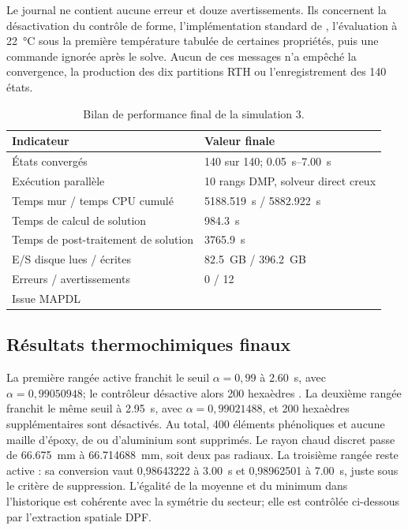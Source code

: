 \documentclass[oneside,openany]{amsdtx}
\begin{document}
Le journal ne contient aucune erreur et douze avertissements. Ils concernent
la désactivation du contrôle de forme, l'implémentation standard de
, l'évaluation à \SI{22}{\celsius} sous la première température
tabulée de certaines propriétés, puis une commande  ignorée
après le solve. Aucun de ces messages n'a empêché la convergence, la production
des dix partitions RTH ou l'enregistrement des 140 états.

\begin{table}[H]
\centering
\small
\renewcommand{\arraystretch}{1.15}
\begin{tabular}{L{0.49\textwidth}L{0.37\textwidth}}
\toprule
\textbf{Indicateur} & \textbf{Valeur finale} \\
\midrule
États convergés & 140 sur 140; \SIrange{0.05}{7.00}{s} \\
Exécution parallèle & 10 rangs DMP, solveur direct creux \\
Temps mur / temps CPU cumulé & \SI{5188.519}{s} / \SI{5882.922}{s} \\
Temps de calcul de solution & \SI{984.3}{s} \\
Temps de post-traitement de solution & \SI{3765.9}{s} \\
E/S disque lues / écrites & \SI{82.5}{GB} / \SI{396.2}{GB} \\
Erreurs / avertissements & 0 / 12 \\
Issue MAPDL &  \\
\bottomrule
\end{tabular}
\caption{Bilan de performance final de la simulation 3.}
\label{tab:sim3-performance}
\end{table}

\subsection{Résultats thermochimiques finaux}

La première rangée active franchit le seuil \(\alpha=0{,}99\) à
\SI{2.60}{s}, avec \(\alpha=0{,}99050948\); le contrôleur désactive alors 200
hexaèdres . La deuxième rangée franchit le même seuil à
\SI{2.95}{s}, avec \(\alpha=0{,}99021488\), et 200 hexaèdres supplémentaires
sont désactivés. Au total, 400 éléments phénoliques et aucune maille d'époxy,
de  ou d'aluminium sont supprimés. Le rayon chaud discret passe de
\SI{66.675}{mm} à \SI{66.714688}{mm}, soit deux pas radiaux. La troisième
rangée reste active : sa conversion vaut 0,98643222 à \SI{3.00}{s} et
0,98962501 à \SI{7.00}{s}, juste sous le critère de suppression. L'égalité de
la moyenne et du minimum dans l'historique est cohérente avec la symétrie du
secteur; elle est contrôlée ci-dessous par l'extraction spatiale DPF.
\end{document}
